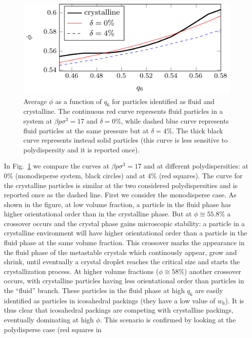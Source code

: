 \documentclass[twocolumn,superscriptaddress]{revtex4-1}
\begin{document}
\begin{figure}
 \centering
 \includegraphics{fig_stability_map}
 \caption{Average $\phi$ as a function of $q_6$ for particles identified as fluid and crystalline. The continuous red curve represents fluid particles in a system at $\beta p\sigma^3=17$ and $\delta=0\%$, while dashed blue curve represents fluid particles at the same pressure but at $\delta=4\%$. The thick black curve represents instead solid particles (this curve is less sensitive to polydispersity and it is reported once).}
 \label{fig:stability_map}
\end{figure}
In Fig.~\ref{fig:stability_map}
we compare the curves at $\beta p\sigma^3=17$ and at different polydispersities:
at $0\%$ (monodisperse system, black circles) and at $4\%$ (red squares). The curve for the
crystalline particles is similar at the two considered polydispersities and is reported once
as the dashed line. First we consider the monodisperse case. As shown in the figure,
at low volume fraction, a particle in the fluid phase has higher orientational order than in the crystalline phase.
But at $\phi\cong 55.8\%$ a crossover
occurs and the crystal phase gains microscopic stability: a particle in a crystalline environment will
have higher orientational order than a particle in the fluid phase at the same volume fraction.
This crossover marks the appearance in the fluid phase of the metastable crystals which continously
appear, grow and shrink, until eventually a crystal droplet reaches the critical size and starts the
crystallization process.
At higher volume fractions ($\phi\cong 58\%$) another crossover occurs, with
crystalline particles having less orientational order than particles in the ``fluid'' branch.
These particles in the fluid phase at high $q_6$ are easily identified as particles in icosahedral packings (they have
a low value of $w_6$).
It is thus clear that icosahedral packings are competing with crystalline packings, eventually dominating
at high $\phi$. This scenario is confirmed by looking at the polydisperse case (red squares in
\end{document}
